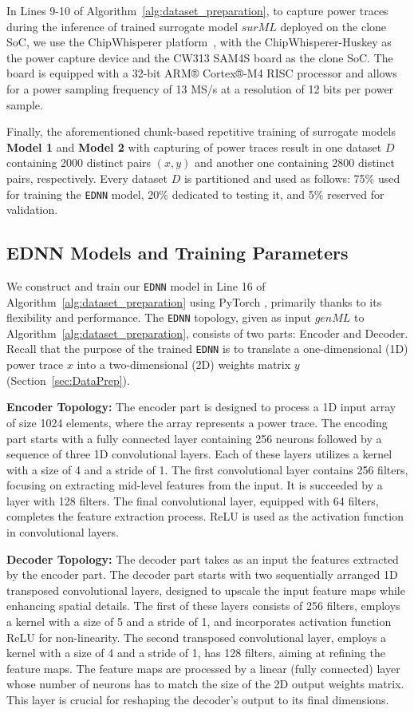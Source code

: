 \documentclass[letterpaper]{article}
\begin{document}
In Lines 9-10 of Algorithm~\ref{alg:dataset_preparation}, to capture power traces during the inference of trained surrogate model $surML$ deployed on the clone SoC, we use the ChipWhisperer platform~\cite{o2014chipwhisperer}, with the ChipWhisperer-Huskey as the power capture device and the CW313 SAM4S board as the clone SoC. The board is equipped with a 32-bit ARM® Cortex®-M4 RISC processor and allows for a power sampling frequency of 13 MS/s at a resolution of 12 bits per power sample.

Finally, the aforementioned chunk-based repetitive training of surrogate models \textbf{Model 1} and \textbf{Model 2} with capturing of power traces result in one dataset $D$ containing 2000 distinct pairs $(x, y)$ and another one containing 2800 distinct pairs, respectively. Every dataset $D$ is partitioned and used as follows: 75\% used for training the \texttt{EDNN} model, 20\% dedicated to testing it, and 5\% reserved for validation.

\subsection{EDNN Models and Training Parameters} 
\label{sec:AutoEncTop}
We construct and train our \texttt{EDNN} model in Line 16 of Algorithm~\ref{alg:dataset_preparation} using PyTorch \cite{10.5555/3454287.3455008}, primarily thanks to its flexibility and performance. The \texttt{EDNN} topology, given as input $genML$ to Algorithm~\ref{alg:dataset_preparation}, consists of two parts: Encoder and Decoder. Recall that the purpose of the trained \texttt{EDNN} is to translate a one-dimensional (1D) power trace $x$ into a two-dimensional (2D) weights matrix $y$ (Section~\ref{sec:DataPrep}). 

\textbf{Encoder Topology: }
The encoder part is designed to process a 1D input array of size 1024 elements, where the array represents a power trace. The encoding part starts with a fully connected layer containing 256 neurons followed by a sequence of three 1D convolutional layers. Each of these layers utilizes a kernel with a size of 4 and a stride of 1. The first convolutional layer contains 256 filters, focusing on extracting mid-level features from the input. It is succeeded by a layer with 128 filters. The final convolutional layer, equipped with 64 filters, completes the feature extraction process. ReLU is used as the activation function in convolutional layers.

\textbf{Decoder Topology:}
The decoder part takes as an input the features extracted by the encoder part. The decoder part starts with two sequentially arranged 1D transposed convolutional layers, designed to upscale the input feature maps while enhancing spatial details. The first of these layers consists of 256 filters, employs a kernel with a size of 5 and a stride of 1, and incorporates activation function ReLU for non-linearity. The second transposed convolutional layer, employs a kernel with a size of 4 and a stride of 1, has 128 filters, aiming at refining the feature maps. The feature maps are processed by a linear (fully connected) layer whose number of neurons has to match the size of the 2D output weights matrix. This layer is crucial for reshaping the decoder's output to its final dimensions. 
\end{document}
